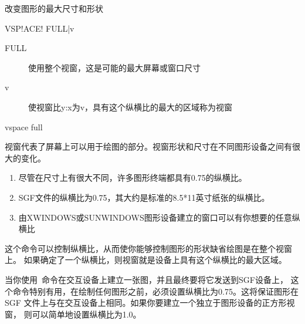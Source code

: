 \label{cmd:vspace}

改变图形的最大尺寸和形状

\begin{SACSTX}
VSP!ACE! FULL|v
\end{SACSTX}

\begin{description}
\item [FULL] 使用整个视窗，这是可能的最大屏幕或窗口尺寸
\item [v] 使视窗比y:x为v，具有这个纵横比的最大的区域称为视窗
\end{description}

\begin{SACDFT}
vspace full
\end{SACDFT}

视窗代表了屏幕上可以用于绘图的部分。视窗形状和尺寸在不同图形设备之间有很大的变化。
\begin{enumerate}
\item 尽管在尺寸上有很大不同，许多图形终端都具有0.75的纵横比。
\item SGF文件的纵横比为0.75，其大约是标准的8.5*11英寸纸张的纵横比。
\item  由XWINDOWS或SUNWINDOWS图形设备建立的窗口可以有你想要的任意纵横比
\end{enumerate}

这个命令可以控制纵横比，从而使你能够控制图形的形状缺省绘图是在整个视窗上。
如果确定了一个纵横比，则视窗就是设备上具有这个纵横比的最大区域。

当你使用~命令在交互设备上建立一张图，并且最终要将它发送到SGF设备上，
这个命令特别有用，在绘制任何图形之前，必须设置纵横比为0.75。这将保证图形在SGF
文件上与在交互设备上相同。如果你要建立一个独立于图形设备的正方形视窗，
则可以简单地设置纵横比为1.0。
